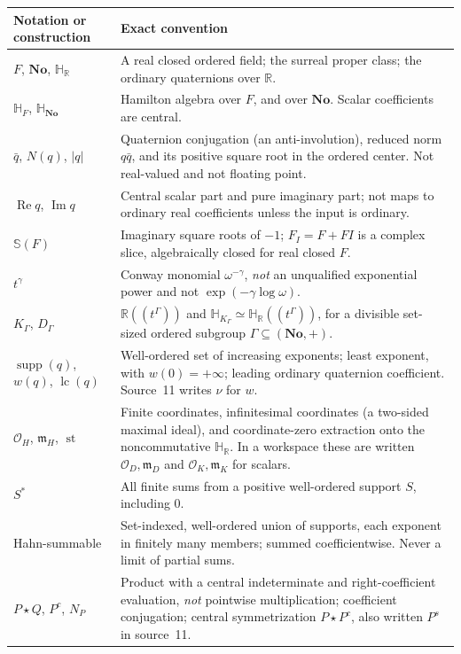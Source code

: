 \documentclass[11pt,letterpaper]{article}
\numberwithin{equation}{section}
\theoremstyle{definition}
\theoremstyle{remark}
\newcommand{\No}{\mathbf{No}}
\newcommand{\SQ}{\mathbb H_{\No}}
\newcommand{\HF}{\mathbb H_F}
\newcommand{\HR}{\mathbb H_{\mathbb R}}
\newcommand{\R}{\mathbb R}
\newcommand{\OO}{\mathcal O}
\newcommand{\mm}{\mathfrak m}
\newcommand{\Rea}{\operatorname{Re}}
\newcommand{\Ima}{\operatorname{Im}}
\newcommand{\st}{\operatorname{st}}
\newcommand{\supp}{\operatorname{supp}}
\newcommand{\lc}{\operatorname{lc}}
\newcommand{\abs}[1]{\left|#1\right|}
\begin{document}
\begingroup
\setlength{\parskip}{0pt}
\begin{longtable}{L{0.21\textwidth}L{0.71\textwidth}}
\toprule
Notation or construction & Exact convention\\
\midrule
\endhead
\midrule
\endfoot
\bottomrule
\endlastfoot
$F$, $\No$, $\HR$ & A real closed ordered field; the surreal proper class; the ordinary
quaternions over $\R$.\\
$\HF$, $\SQ$ & Hamilton algebra over $F$, and over $\No$. Scalar coefficients are
central.\\
$\bar q$, $N(q)$, $\abs q$ & Quaternion conjugation (an anti-involution), reduced norm
$q\bar q$, and its positive square root in the ordered center. Not real-valued and not
floating point.\\
$\Rea q$, $\Ima q$ & Central scalar part and pure imaginary part; not maps to ordinary real
coefficients unless the input is ordinary.\\
$\mathbb S(F)$ & Imaginary square roots of $-1$; $F_I=F+FI$ is a complex slice,
algebraically closed for real closed $F$.\\
$t^\gamma$ & Conway monomial $\omega^{-\gamma}$, \emph{not} an unqualified exponential
power and not $\exp(-\gamma\log\omega)$.\\
$K_\Gamma$, $D_\Gamma$ & $\R((t^\Gamma))$ and $\mathbb H_{K_\Gamma}\simeq\HR((t^\Gamma))$,
for a divisible set-sized ordered subgroup $\Gamma\subseteq(\No,+)$.\\
$\supp(q)$, $w(q)$, $\lc(q)$ & Well-ordered set of increasing exponents; least exponent,
with $w(0)=+\infty$; leading ordinary quaternion coefficient. Source~11 writes $\nu$ for
$w$.\\
$\OO_H$, $\mm_H$, $\st$ & Finite coordinates, infinitesimal coordinates (a two-sided
maximal ideal), and coordinate-zero extraction onto the noncommutative $\HR$. In a
workspace these are written $\OO_D,\mm_D$ and $\OO_K,\mm_K$ for scalars.\\
$S^*$ & All finite sums from a positive well-ordered support $S$, including $0$.\\
Hahn-summable & Set-indexed, well-ordered union of supports, each exponent in finitely many
members; summed coefficientwise. Never a limit of partial sums.\\
$P\star Q$, $P^c$, $N_P$ & Product with a central indeterminate and right-coefficient
evaluation, \emph{not} pointwise multiplication; coefficient conjugation; central
symmetrization $P\star P^c$, also written $P^s$ in source~11.\\

\end{longtable}
\end{document}
